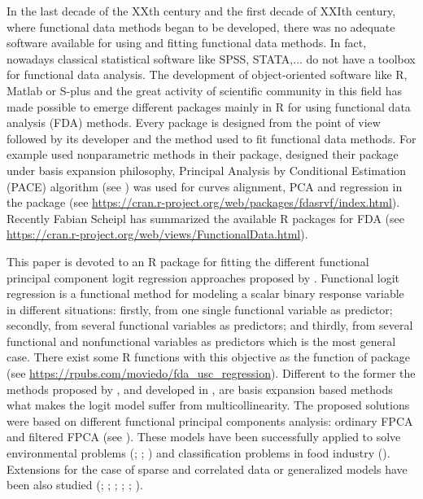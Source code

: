 In the last decade of the XXth century and the first decade of XXIth century, where functional data methods began to be developed, there was no adequate software available for using and fitting functional data methods. In fact, nowadays classical statistical software like SPSS, STATA,... do not have a toolbox for functional data analysis. The development of object-oriented software like R, Matlab or S-plus and the great activity of scientific community in this field has made possible to emerge different packages mainly in R for using functional data analysis (FDA) methods. Every package is designed from the point of view followed by its developer and the method used to fit functional data methods. For example \cite{Febrero2012} used nonparametric methods in their  package, \cite{Ramsay09} designed their  package under basis expansion philosophy, Principal Analysis by Conditional Estimation (PACE) algorithm (see \cite{Zhu2014}) was used for curves alignment, PCA and regression in the  package (see \url{https://cran.r-project.org/web/packages/fdasrvf/index.html}). Recently Fabian Scheipl has summarized the available R packages for FDA (see \url{https://cran.r-project.org/web/views/FunctionalData.html}).

This paper is devoted to  an R package for fitting the different functional principal component logit regression approaches proposed by \cite{Escabias04}. Functional logit regression is a functional method for modeling a scalar binary response variable in different situations: firstly, from one single functional variable as predictor; secondly, from several functional variables as predictors; and thirdly, from several functional and nonfunctional variables as predictors which is the most general case. There exist some R functions with this objective as the  function of  package (see \url{https://rpubs.com/moviedo/fda_usc_regression}). Different to the former the methods proposed by \cite{Escabias04}, and developed in , are basis expansion based methods what makes the logit model suffer from multicollinearity. The proposed solutions were based on different functional principal components analysis: ordinary FPCA and filtered FPCA (see \cite{Escabias2014}). These models have been successfully applied to solve environmental problems (\cite{Aguilera20083187}; \cite{Escabias200595}; \cite{Escabias2013}) and classification problems in food industry (\cite{AguileraLisboa}). Extensions for the case of sparse and correlated data or generalized models have been also studied (\cite{James2002}; \cite{Muller05}; \cite{AguileraMorillo2012}; \cite{Mousavi2018}; \cite{Tapia2019}; \cite{Bianco2021}). 

